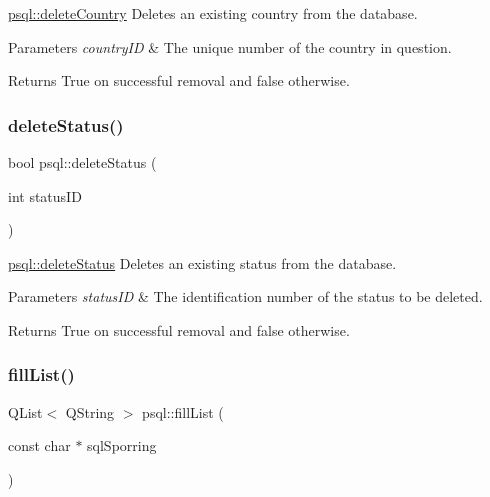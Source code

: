 \mbox{\hyperlink{classpsql_a914bf8701fbed4ff80edcd0d09c7c3fd}{psql\+::delete\+Country}} Deletes an existing country from the database. 


\begin{DoxyParams}{Parameters}
{\em country\+ID} & The unique number of the country in question. \\
\hline
\end{DoxyParams}
\begin{DoxyReturn}{Returns}
True on successful removal and false otherwise. 
\end{DoxyReturn}
\mbox{\label{classpsql_a26fc592cfb9f484e1bee62af527f2b95}} 
\subsubsection{\texorpdfstring{deleteStatus()}{deleteStatus()}}
{\footnotesize\ttfamily bool psql\+::delete\+Status (\begin{DoxyParamCaption}\item[{int}]{status\+ID }\end{DoxyParamCaption})}



\mbox{\hyperlink{classpsql_a26fc592cfb9f484e1bee62af527f2b95}{psql\+::delete\+Status}} Deletes an existing status from the database. 


\begin{DoxyParams}{Parameters}
{\em status\+ID} & The identification number of the status to be deleted. \\
\hline
\end{DoxyParams}
\begin{DoxyReturn}{Returns}
True on successful removal and false otherwise. 
\end{DoxyReturn}
\mbox{\label{classpsql_a2ad41caea89dc5af0b55b12f6394fbf5}} 
\subsubsection{\texorpdfstring{fillList()}{fillList()}}
{\footnotesize\ttfamily Q\+List$<$ Q\+String $>$ psql\+::fill\+List (\begin{DoxyParamCaption}\item[{const char $\ast$}]{sql\+Sporring }\end{DoxyParamCaption})}



